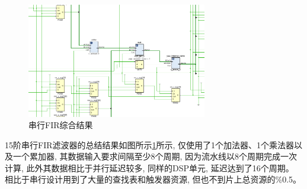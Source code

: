 \documentclass{article}
\begin{document}
\begin{figure}[H]
    \centering
    \includegraphics[width=0.7\textwidth]{image/2024-06-27-02-25-16.png}
    \caption{串行FIR综合结果}
    \label{image_design_extend_1}
\end{figure}
15阶串行FIR滤波器的总结结果如图所示\ref{image_design_extend_1}所示, 仅使用了1个加法器、1个乘法器以及一个累加器,
其数据输入要求间隔至少8个周期, 因为流水线以8个周期完成一次计算, 此外其数据相比于并行延迟较多, 同样的DSP单元, 延迟达到了16个周期。 
相比于串行设计用到了大量的查找表和触发器资源, 但也不到片上总资源的\%0.5。
\end{document}
